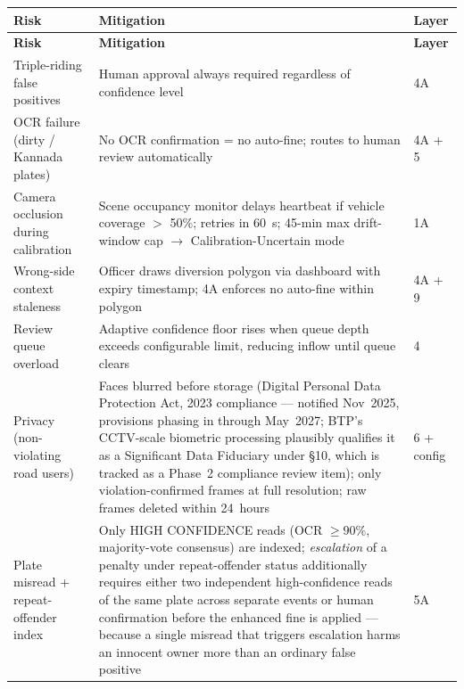 \documentclass[11pt,a4paper]{article}
\begin{document}
\begin{longtable}{L{4cm} L{9cm} C{1.8cm}}
    \toprule
    \color{white}\textbf{Risk} & \color{white}\textbf{Mitigation} & \color{white}\textbf{Layer} \\
    \midrule
    \endfirsthead
    \toprule
    \color{white}\textbf{Risk} & \color{white}\textbf{Mitigation} & \color{white}\textbf{Layer} \\
    \midrule
    \endhead
    \bottomrule
    \endfoot

    Triple-riding false positives & Human approval always required regardless of confidence level & 4A \\
    OCR failure (dirty / Kannada plates) & No OCR confirmation = no auto-fine; routes to human review automatically & 4A + 5 \\
    Camera occlusion during calibration & Scene occupancy monitor delays heartbeat if vehicle coverage $>$ 50\%; retries in 60~s; 45-min max drift-window cap $\rightarrow$ Calibration-Uncertain mode & 1A \\
    Wrong-side context staleness & Officer draws diversion polygon via dashboard with expiry timestamp; 4A enforces no auto-fine within polygon & 4A + 9 \\
    Review queue overload & Adaptive confidence floor rises when queue depth exceeds configurable limit, reducing inflow until queue clears & 4 \\
    Privacy (non-violating road users) & Faces blurred before storage (Digital Personal Data Protection Act, 2023 compliance --- notified Nov~2025, provisions phasing in through May~2027; BTP's CCTV-scale biometric processing plausibly qualifies it as a Significant Data Fiduciary under \S10, which is tracked as a Phase~2 compliance review item); only violation-confirmed frames at full resolution; raw frames deleted within 24~hours & 6 + config \\
    Plate misread + repeat-offender index & Only HIGH CONFIDENCE reads (OCR $\geq 90\%$, majority-vote consensus) are indexed; \emph{escalation} of a penalty under repeat-offender status additionally requires either two independent high-confidence reads of the same plate across separate events or human confirmation before the enhanced fine is applied --- because a single misread that triggers escalation harms an innocent owner more than an ordinary false positive & 5A \\
\end{longtable}
\end{document}

